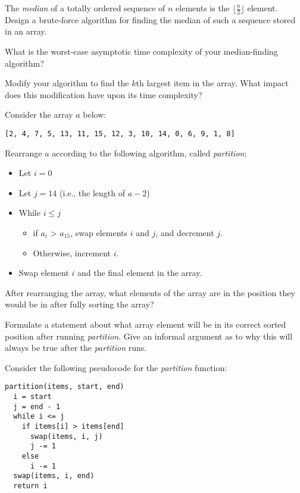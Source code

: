 \documentclass{tufte-handout}
\begin{document}
\begin{questions}
\item The \emph{median} of a totally ordered sequence of $n$ elements is the $\lfloor \frac{n}{2} \rfloor$ element. Design a brute-force algorithm for finding the median of such a sequence stored in an array.

\item What is the worst-case asymptotic time complexity of your median-finding algorithm?

\item Modify your algorithm to find the $k$th largest item in the array. What impact does this modification have upon its time complexity?

\item Consider the array $a$ below:

\begin{verbatim}
[2, 4, 7, 5, 13, 11, 15, 12, 3, 10, 14, 0, 6, 9, 1, 8]
\end{verbatim}

Rearrange $a$ according to the following algorithm, called \emph{partition}:
\begin{itemize}
    \item Let $i = 0$
    \item Let $j = 14$ (i.e., the length of $a - 2$)
    \item While $i \le j$
    \begin{itemize}
        \item if $a_i$ > $a_{15}$, swap elements $i$ and $j$, and decrement $j$.
        \item Otherwise, increment $i$.
    \end{itemize}
    \item Swap element $i$ and the final element in the array.
\end{itemize}

\item After rearranging the array, what elements of the array are in the position they would be in after fully sorting the array?

\item Formulate a statement about what array element will be in its correct sorted position after running \emph{partition}. Give an informal argument as to why this will always be true after the \emph{partition} runs.

\item Consider the following pseudocode for the \emph{partition} function:
\begin{verbatim}
partition(items, start, end)
  i = start
  j = end - 1
  while i <= j
    if items[i] > items[end]
      swap(items, i, j)
      j -= 1
    else
      i -= 1
  swap(items, i, end)
  return i
\end{verbatim}


\end{questions}
\end{document}
